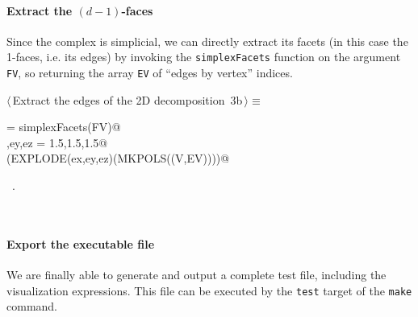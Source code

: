 \documentclass[11pt,oneside]{article}	%
\begin{document}
\paragraph{Extract the $(d-1)$-faces}
Since the complex is simplicial, we can directly extract its facets (in this case the 1-faces, i.e. its edges) by invoking the \texttt{simplexFacets} function on the argument \texttt{FV}, so returning the array \texttt{EV} of ``edges by vertex'' indices. 

\begin{flushleft} \small
\begin{minipage}{\linewidth} \label{scrap3}
\protect{}$\langle\,$Extract the edges of the 2D decomposition\nobreak\ {\footnotesize 3b}$\,\rangle\equiv$
\vspace{-1ex}
\begin{list}{}{} \item
\mbox{}\verb@EV = simplexFacets(FV)@\\
\mbox{}\verb@ex,ey,ez = 1.5,1.5,1.5@\\
\mbox{}\verb@VIEW(EXPLODE(ex,ey,ez)(MKPOLS((V,EV))))@\\
\mbox{}\verb@@{\NWsep}
\end{list}
\vspace{-1ex}
\footnotesize\addtolength{\baselineskip}{-1ex}
\begin{list}{}{\setlength{\itemsep}{-\parsep}\setlength{\itemindent}{-\leftmargin}}
\item \NWtxtMacroRefIn\ .
\end{list}
\end{minipage}\\[4ex]
\end{flushleft}

\paragraph{Export the executable file}
We are finally able to generate and output a complete test file, including the visualization expressions. This file can be executed by the \texttt{test} target of the \texttt{make} command.
\end{document}
